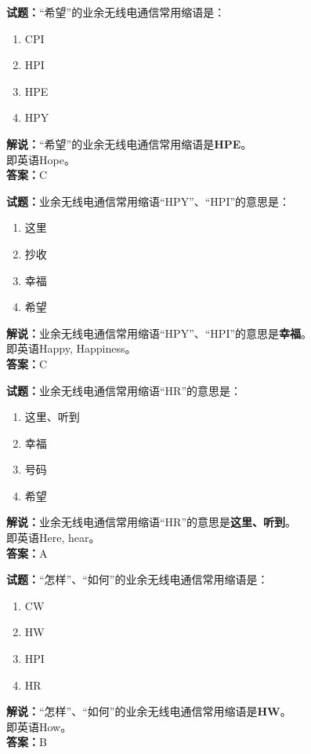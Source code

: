 \documentclass{ctexbook}
\begin{document}
\bigskip


\noindent\textbf{试题：}“希望”的业余无线电通信常用缩语是：
\begin{enumerate}[leftmargin=3em]
\item CPI
\item HPI
\item HPE
\item HPY
\end{enumerate}
\noindent\textbf{解说：}“希望”的业余无线电通信常用缩语是\textbf{HPE}。\\即英语Hope。\\\noindent\textbf{答案：}C



\bigskip


\noindent\textbf{试题：}业余无线电通信常用缩语“HPY”、“HPI”的意思是：
\begin{enumerate}[leftmargin=3em]
\item 这里
\item 抄收
\item 幸福
\item 希望
\end{enumerate}
\noindent\textbf{解说：}业余无线电通信常用缩语“HPY”、“HPI”的意思是\textbf{幸福}。\\即英语Happy, Happiness。\\\noindent\textbf{答案：}C



\bigskip


\noindent\textbf{试题：}业余无线电通信常用缩语“HR”的意思是：
\begin{enumerate}[leftmargin=3em]
\item 这里、听到
\item 幸福
\item 号码
\item 希望
\end{enumerate}
\noindent\textbf{解说：}业余无线电通信常用缩语“HR”的意思是\textbf{这里、听到}。\\即英语Here, hear。\\\noindent\textbf{答案：}A

\bigskip


\noindent\textbf{试题：}“怎样”、“如何”的业余无线电通信常用缩语是：
\begin{enumerate}[leftmargin=3em]
\item CW
\item HW
\item HPI
\item HR
\end{enumerate}
\noindent\textbf{解说：}“怎样”、“如何”的业余无线电通信常用缩语是\textbf{HW}。\\即英语How。\\\noindent\textbf{答案：}B
\end{document}
